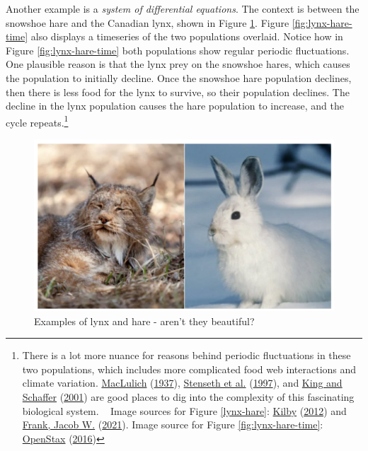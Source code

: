 \documentclass[
]{krantz}
\theoremstyle{definition}
\theoremstyle{definition}
\theoremstyle{definition}
\theoremstyle{definition}
\theoremstyle{remark}
\begin{document}
Another example is a \emph{system of differential equations}. The context is between the snowshoe hare and the Canadian lynx, shown in Figure \ref{fig:lynx-hare}. Figure \ref{fig:lynx-hare-time} also displays a timeseries of the two populations overlaid. Notice how in Figure \ref{fig:lynx-hare-time} both populations show regular periodic fluctuations. One plausible reason is that the lynx prey on the snowshoe hares, which causes the population to initially decline. Once the snowshoe hare population declines, then there is less food for the lynx to survive, so their population declines. The decline in the lynx population causes the hare population to increase, and the cycle repeats.\footnote{There is a lot more nuance for reasons behind periodic fluctuations in these two populations, which includes more complicated food web interactions and climate variation. \protect\hyperlink{ref-maclulich_fluctuations_1937}{MacLulich} (\protect\hyperlink{ref-maclulich_fluctuations_1937}{1937}), \protect\hyperlink{ref-stenseth_population_1997}{Stenseth et al.} (\protect\hyperlink{ref-stenseth_population_1997}{1997}), and \protect\hyperlink{ref-king_geometry_2001}{King and Schaffer} (\protect\hyperlink{ref-king_geometry_2001}{2001}) are good places to dig into the complexity of this fascinating biological system. ~ Image sources for Figure \ref{lynx-hare}: \protect\hyperlink{ref-usa_canada_2012}{Kilby} (\protect\hyperlink{ref-usa_canada_2012}{2012}) and \protect\hyperlink{ref-preserve_snowshoe_2011}{Frank, Jacob W.} (\protect\hyperlink{ref-preserve_snowshoe_2011}{2021}). Image source for Figure \ref{fig:lynx-hare-time}: \protect\hyperlink{ref-openstax_notitle_2016}{OpenStax} (\protect\hyperlink{ref-openstax_notitle_2016}{2016})}

\begin{figure}

{\centering \includegraphics[width=0.7\linewidth]{figures/03-systems/lynx-hare} 

}

\caption{Examples of lynx and hare - aren't they beautiful?}\label{fig:lynx-hare}
\end{figure}
\end{document}
